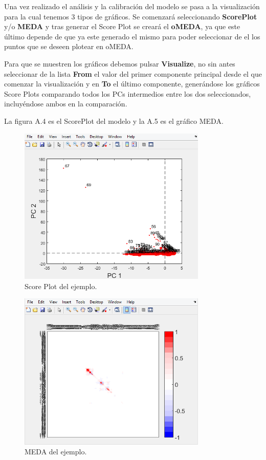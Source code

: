 \bigskip

Una vez realizado el análisis y la calibración del modelo se pasa a la visualización para la cual tenemos 3 tipos de gráficos. Se comenzará seleccionando \textbf{ScorePlot} y/o \textbf{MEDA} y tras generar el Score Plot se creará el \textbf{oMEDA}, ya que este último depende de que ya este generado el mismo para poder seleccionar de el los puntos que se deseen plotear en oMEDA.

\bigskip

Para que se muestren los gráficos debemos pulsar \textbf{Visualize}, no sin antes seleccionar de la lista \textbf{From} el valor del primer componente principal desde el que comenzar la visualización y en \textbf{To} el último componente, generándose los gráficos Score Plots comparando todos los PCs intermedios entre los dos seleccionados, incluyéndose ambos en la comparación.

\bigskip

La figura A.4 es el ScorePlot del modelo y la A.5 es el gráfico MEDA.

\begin{figure}
\centering
\includegraphics[width=0.8\textwidth]{imagenes/figuras/MU-4.png}
\caption{Score Plot del ejemplo.}
\end{figure}

\begin{figure}
\centering
\includegraphics[width=0.8\textwidth]{imagenes/figuras/MU-5.png}
\caption{MEDA del ejemplo.}
\end{figure}

